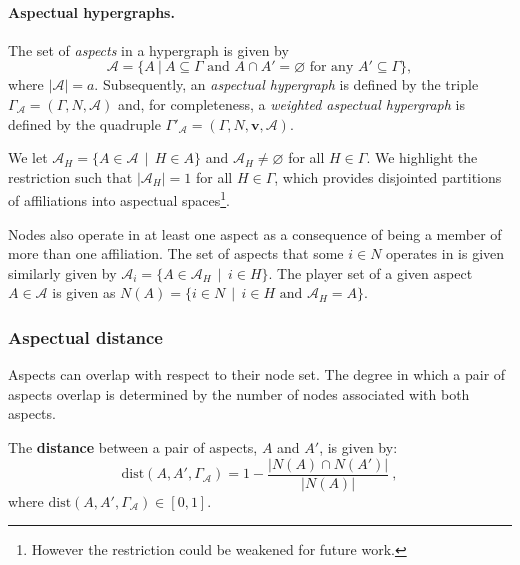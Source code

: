 \paragraph{Aspectual hypergraphs.}

The set of \emph{aspects} in a hypergraph is given by
\begin{equation}
\mathcal{A} = \{ A ~ | ~ A \subseteq \Gamma \mbox{ and } A \cap A' = \varnothing \mbox{ for any } A' \subseteq \Gamma \} ,
\end{equation}
where $| \mathcal{A} | = a$. Subsequently, an \emph{aspectual hypergraph} is defined by the triple $\Gamma_{\mathcal{A}} = (\Gamma, N, \mathcal{A})$ and, for completeness, a \emph{weighted aspectual hypergraph} is defined by the quadruple $\Gamma'_{\mathcal{A}}= (\Gamma, N, \mathbf{v}, \mathcal{A})$.

We let $\mathcal{A}_{H} = \{ A \in \mathcal{A} \, \mid \, H \in A\}$ and $\mathcal{A}_{H} \neq \varnothing$ for all $H \in \Gamma$. We highlight the restriction such that $| \mathcal{A}_{H} | = 1$ for all $H \in \Gamma$, which provides disjointed partitions of affiliations into aspectual spaces\footnote{However the restriction could be weakened for future work.}.

Nodes also operate in at least one aspect as a consequence of being a member of more than one affiliation. The set of aspects that some $i \in N$ operates in is given similarly given by $\mathcal{A}_{i} = \{ A \in \mathcal{A}_{H} \, \mid \, i \in H \}$. The player set of a given aspect $A \in \mathcal{A}$ is given as $N(A) = \{ i \in N \, \mid \, i \in H \text{ and } \mathcal{A}_{H} = A \}$.

\subsubsection*{Aspectual distance}

Aspects can overlap with respect to their node set. The degree in which a pair of aspects overlap is determined by the number of nodes associated with both aspects.

\begin{definition}
The \textbf{distance} between a pair of aspects, $A$ and $A'$, is given by:
\begin{equation}
\mbox{dist}(A, A',\Gamma_{\mathcal{A}}) = 1 - \frac{| N(A) \cap N(A') |}{| N(A) |} ~ ,
\end{equation}
where $\mbox{dist}(A, A',\Gamma_{\mathcal{A}}) \in [0,1]$.
\end{definition}

